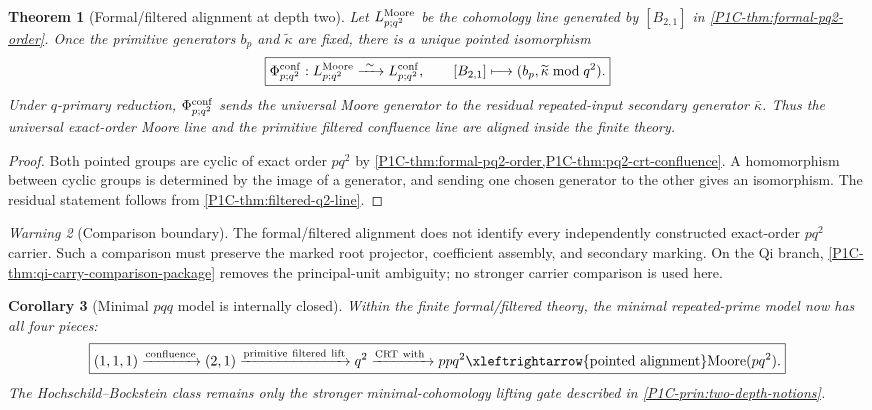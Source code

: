 \documentclass[11pt]{article}
\newtheorem{theorem}{Theorem}[section]
\newtheorem{corollary}[theorem]{Corollary}
\theoremstyle{remark}
\newtheorem{warning}[theorem]{Warning}
\begin{document}
\begin{theorem}[Formal/filtered alignment at depth two]\label{P1C-thm:formal-filtered-alignment}
Let $L^{\rm Moore}_{p;q^2}$ be the cohomology line generated by $[B_{2,1}]$ in
\cref{P1C-thm:formal-pq2-order}.  Once the primitive generators $b_p$ and
$\widetilde\kappa$ are fixed, there is a unique pointed isomorphism
\[
 \boxed{
 \Phi^{\rm conf}_{p;q^2}:
 L^{\rm Moore}_{p;q^2}
 \xrightarrow{\ \sim\ }
 L^{\rm conf}_{p;q^2},
 \qquad
 [B_{2,1}]\longmapsto
 (b_p,\widetilde\kappa\bmod q^2).}
\]
Under $q$-primary reduction, $\Phi^{\rm conf}_{p;q^2}$ sends the universal Moore
generator to the residual repeated-input secondary generator $\bar\kappa$.
Thus the universal exact-order Moore line and the primitive filtered confluence line
are aligned inside the finite theory.
\end{theorem}

\begin{proof}
Both pointed groups are cyclic of exact order $pq^2$ by
\cref{P1C-thm:formal-pq2-order,P1C-thm:pq2-crt-confluence}.  A homomorphism between
cyclic groups is determined by the image of a generator, and sending one chosen
generator to the other gives an isomorphism.  The residual statement follows from
\cref{P1C-thm:filtered-q2-line}.
\end{proof}

\begin{warning}[Comparison boundary]\label{P1C-warn:external-ray-alignment}
The formal/filtered alignment does not identify every independently constructed
exact-order \(pq^2\) carrier.  Such a comparison must preserve the marked root
projector, coefficient assembly, and secondary marking.  On the Qi branch,
\cref{P1C-thm:qi-carry-comparison-package} removes the principal-unit ambiguity;
no stronger carrier comparison is used here.
\end{warning}

\begin{corollary}[Minimal $pqq$ model is internally closed]\label{P1C-cor:minimal-pqq-closed}
Within the finite formal/filtered theory, the minimal repeated-prime model now has all four pieces:
\[
 \boxed{
 (1,1,1)\xrightarrow{\rm confluence}(2,1)
 \xrightarrow{\rm primitive\ filtered\ lift}q^2
 \xrightarrow{\rm CRT\ with\ }p pq^2
 \xleftrightarrow{\rm pointed\ alignment}
 \text{Moore}(pq^2).}
\]
The Hochschild--Bockstein class remains only the stronger minimal-cohomology lifting
gate described in \cref{P1C-prin:two-depth-notions}.
\end{corollary}
\end{document}
